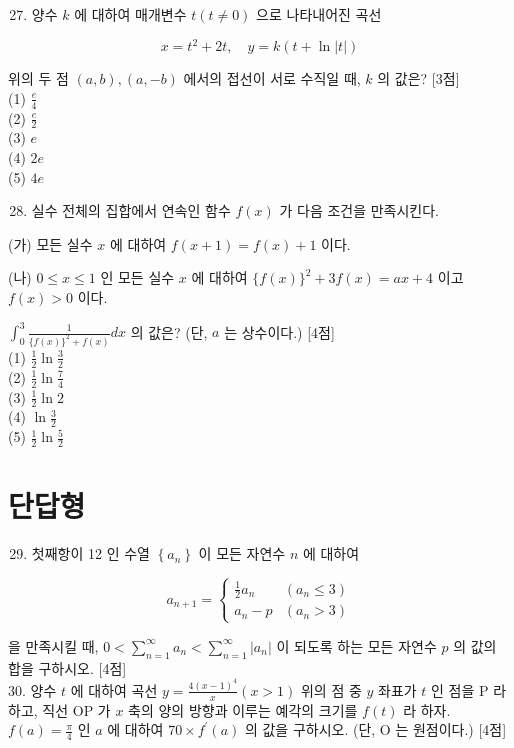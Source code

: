 \documentclass[10pt]{article}
\begin{document}
\begin{enumerate}
  \setcounter{enumi}{26}
  \item 양수 $k$ 에 대하여 매개변수 $t(t \neq 0)$ 으로 나타내어진 곡선
\end{enumerate}

\[
x=t^{2}+2 t, \quad y=k(t+\ln |t|)
\]

위의 두 점 $(a, b),(a,-b)$ 에서의 접선이 서로 수직일 때, $k$ 의 값은? [3점]\\
(1) $\frac{e}{4}$\\
(2) $\frac{e}{2}$\\
(3) $e$\\
(4) $2 e$\\
(5) $4 e$

\begin{enumerate}
  \setcounter{enumi}{27}
  \item 실수 전체의 집합에서 연속인 함수 $f(x)$ 가 다음 조건을 만족시킨다.
\end{enumerate}

(가) 모든 실수 $x$ 에 대하여 $f(x+1)=f(x)+1$ 이다.

(나) $0 \leq x \leq 1$ 인 모든 실수 $x$ 에 대하여 $\{f(x)\}^{2}+3 f(x)=a x+4$ 이고 $f(x)>0$ 이다.

$\int_{0}^{3} \frac{1}{\{f(x)\}^{2}+f(x)} d x$ 의 값은? (단, $a$ 는 상수이다.) [4점]\\
(1) $\frac{1}{2} \ln \frac{3}{2}$\\
(2) $\frac{1}{2} \ln \frac{7}{4}$\\
(3) $\frac{1}{2} \ln 2$\\
(4) $\ln \frac{3}{2}$\\
(5) $\frac{1}{2} \ln \frac{5}{2}$

\section*{단답형}
\begin{enumerate}
  \setcounter{enumi}{28}
  \item 첫째항이 12 인 수열 $\left\{a_{n}\right\}$ 이 모든 자연수 $n$ 에 대하여
\end{enumerate}

\[
a_{n+1}= \begin{cases}\frac{1}{2} a_{n} & \left(a_{n} \leq 3\right) \\ a_{n}-p & \left(a_{n}>3\right)\end{cases}
\]

을 만족시킬 때, $0<\sum_{n=1}^{\infty} a_{n}<\sum_{n=1}^{\infty}\left|a_{n}\right|$ 이 되도록 하는 모든 자연수 $p$ 의 값의 합을 구하시오. [4점]\\
30. 양수 $t$ 에 대하여 곡선 $y=\frac{4(x-1)^{4}}{x}(x>1)$ 위의 점 중 $y$ 좌표가 $t$ 인 점을 P 라 하고, 직선 OP 가 $x$ 축의 양의 방향과 이루는 예각의 크기를 $f(t)$ 라 하자. $f(a)=\frac{\pi}{4}$ 인 $a$ 에 대하여 $70 \times f^{\prime}(a)$ 의 값을 구하시오. (단, O 는 원점이다.) [4점]
\end{document}
